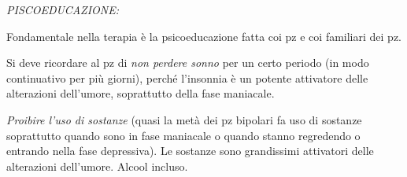 \documentclass[]{article}
\begin{document}
\emph{PISCOEDUCAZIONE:}

Fondamentale nella terapia è la psicoeducazione fatta coi pz e coi
familiari dei pz.

Si deve ricordare al pz di \emph{non perdere sonno} per un certo periodo
(in modo continuativo per più giorni), perché l'insonnia è un potente
attivatore delle alterazioni dell'umore, soprattutto della fase
maniacale.

\emph{Proibire l'uso di sostanze} (quasi la metà dei pz bipolari fa uso
di sostanze soprattutto quando sono in fase maniacale o quando stanno
regredendo o entrando nella fase depressiva). Le sostanze sono
grandissimi attivatori delle alterazioni dell'umore. Alcool incluso.
\end{document}
